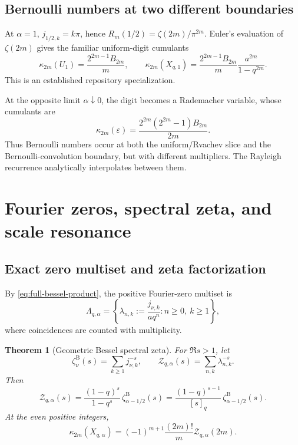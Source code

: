 \documentclass[11pt]{article}
\newtheorem{theorem}{Theorem}[section]
\theoremstyle{definition}
\theoremstyle{remark}
\newcommand{\Zcal}{\mathcal{Z}}
\begin{document}
\subsection{Bernoulli numbers at two different boundaries}

At \(\alpha=1\), \(j_{1/2,k}=k\pi\), hence
\(R_m(1/2)=\zeta(2m)/\pi^{2m}\).  Euler's evaluation of \(\zeta(2m)\)
gives the familiar uniform-digit cumulants
\begin{equation}
 \kappa_{2m}(U_1)=\frac{2^{2m-1}B_{2m}}m,
 \qquad
 \kappa_{2m}(X_{q,1})
 =\frac{2^{2m-1}B_{2m}}m
 \frac{a^{2m}}{1-q^{2m}}.
 \label{eq:uniform-bernoulli-cumulants}
\end{equation}
This is an established repository specialization.

At the opposite limit \(\alpha\downarrow0\), the digit becomes a Rademacher
variable, whose cumulants are
\begin{equation}
 \kappa_{2m}(\varepsilon)
 =\frac{2^{2m}(2^{2m}-1)B_{2m}}{2m}.
 \label{eq:rademacher-cumulants}
\end{equation}
Thus Bernoulli numbers occur at both the uniform/Rvachev slice and the
Bernoulli-convolution boundary, but with different multipliers.  The Rayleigh
recurrence analytically interpolates between them.

\section{Fourier zeros, spectral zeta, and scale resonance}
\label{sec:spectral}

\subsection{Exact zero multiset and zeta factorization}

By \eqref{eq:full-bessel-product}, the positive Fourier-zero multiset is
\begin{equation}
 \Lambda_{q,\alpha}
 =\left\{\lambda_{n,k}:=
 \frac{j_{\nu,k}}{aq^n}:n\ge0,\ k\ge1\right\},
 \label{eq:zero-multiset}
\end{equation}
where coincidences are counted with multiplicity.

\begin{theorem}[Geometric Bessel spectral zeta]
\label{thm:spectral-zeta}
For \(\Re s>1\), let
\begin{equation}
 \zeta_\nu^{\mathrm B}(s)=\sum_{k\ge1}j_{\nu,k}^{-s},
 \qquad
 \Zcal_{q,\alpha}(s)=\sum_{n,k}\lambda_{n,k}^{-s}.
\end{equation}
Then
\begin{equation}
 \boxed{
 \Zcal_{q,\alpha}(s)
 =\frac{(1-q)^s}{1-q^s}\,
 \zeta_{\alpha-1/2}^{\mathrm B}(s)
 =\frac{(1-q)^{s-1}}{[s]_q}\,
 \zeta_{\alpha-1/2}^{\mathrm B}(s).}
 \label{eq:spectral-zeta-factorization}
\end{equation}
At the even positive integers,
\begin{equation}
 \kappa_{2m}(X_{q,\alpha})
 =(-1)^{m+1}\frac{(2m)!}{m}
 \Zcal_{q,\alpha}(2m).
 \label{eq:cumulant-zeta-identity}
\end{equation}
\end{theorem}
\end{document}
